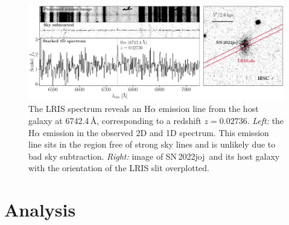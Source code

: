 \documentclass[twocolumn]{aastex631}
\newcommand{\sn}{SN\,2022joj}
\begin{document}
\begin{CJK*}{UTF8}{gbsn}
\begin{figure}
    \label{fig:spec_seq}
\end{figure}
\begin{figure}
    \centering
    \includegraphics[width=\linewidth]{host_spec.pdf}
    \caption{The LRIS spectrum reveals an H$\alpha$ emission line from the host galaxy at 6742.4\,\AA, corresponding to a redshift $z=0.02736$. \textit{Left:} the H$\alpha$ emission in the observed 2D and 1D spectrum. This emission line sits in the region free of strong sky lines and is unlikely due to bad sky subtraction.
    \textit{Right:} image of \sn\ and its host galaxy with the orientation of the LRIS slit overplotted.    
    }
    \label{fig:host_spec}
\end{figure}



\section{Analysis} \label{sec:analysis}

\end{CJK*}
\end{document}
